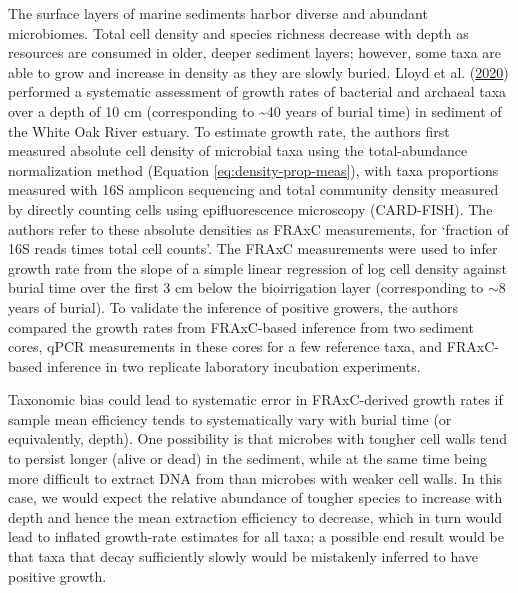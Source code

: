 \documentclass[
]{article}
\begin{document}
The surface layers of marine sediments harbor diverse and abundant microbiomes. Total cell density and species richness decrease with depth as resources are consumed in older, deeper sediment layers; however, some taxa are able to grow and increase in density as they are slowly buried.
Lloyd et al. (\protect\hyperlink{ref-lloyd2020evid}{2020}) performed a systematic assessment of growth rates of bacterial and archaeal taxa over a depth of 10 cm (corresponding to \textasciitilde40 years of burial time) in sediment of the White Oak River estuary.
To estimate growth rate, the authors first measured absolute cell density of microbial taxa using the total-abundance normalization method (Equation \eqref{eq:density-prop-meas}), with taxa proportions measured with 16S amplicon sequencing and total community density measured by directly counting cells using epifluorescence microscopy (CARD-FISH).
The authors refer to these absolute densities as FRAxC measurements, for `fraction of 16S reads times total cell counts'.
The FRAxC measurements were used to infer growth rate from the slope of a simple linear regression of log cell density against burial time over the first 3 cm below the bioirrigation layer (corresponding to \(\sim 8\) years of burial).
To validate the inference of positive growers, the authors compared the growth rates from FRAxC-based inference from two sediment cores, qPCR measurements in these cores for a few reference taxa, and FRAxC-based inference in two replicate laboratory incubation experiments.

Taxonomic bias could lead to systematic error in FRAxC-derived growth rates if sample mean efficiency tends to systematically vary with burial time (or equivalently, depth).
One possibility is that microbes with tougher cell walls tend to persist longer (alive or dead) in the sediment, while at the same time being more difficult to extract DNA from than microbes with weaker cell walls.
In this case, we would expect the relative abundance of tougher species to increase with depth and hence the mean extraction efficiency to decrease, which in turn would lead to inflated growth-rate estimates for all taxa; a possible end result would be that taxa that decay sufficiently slowly would be mistakenly inferred to have positive growth.
\end{document}
